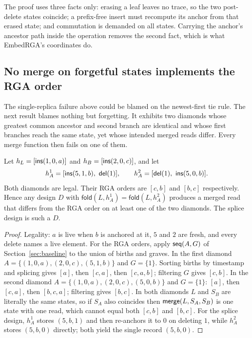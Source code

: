 The proof uses three facts only: erasing a leaf leaves no trace, so the two
post-delete states coincide; a prefix-free insert must recompute its anchor
from that erased state; and commutation is demanded on all states. Carrying
the anchor's ancestor path inside the operation removes the second fact,
which is what EmbedRGA's coordinates do.

\subsection{No merge on forgetful states implements the RGA order}

The single-replica failure above could be blamed on the newest-first tie
rule. The next result blames nothing but forgetting. It exhibits two
diamonds whose greatest common ancestor and second branch are identical and
whose first branches reach the same state, yet whose intended merged reads
differ. Every merge function then fails on one of them.

\begin{theorem}
\label{thm:fooling-rga}
Let $h_L=[\ins(1,0,a)]$ and $h_B=[\ins(2,0,c)]$, and let
\[
 h^1_A=[\ins(5,1,b),\ \del(1)],\qquad
 h^2_A=[\del(1),\ \ins(5,0,b)].
\]
Both diamonds are legal. Their RGA orders are $[c,b]$ and $[b,c]$
respectively. Hence any design $D$ with
$\mathsf{fold}(L,h^1_A)=\mathsf{fold}(L,h^2_A)$ produces a merged read that
differs from the RGA order on at least one of the two diamonds. The splice
design is such a $D$.
\end{theorem}

\begin{proof}
Legality: $a$ is live when $b$ is anchored at it, $5$ and $2$ are fresh, and
every delete names a live element. For the RGA orders, apply
$\seq(A,G)$ of Section~\ref{sec:baseline} to the union of births and graves.
In the first diamond $A=\{(1,0,a),(2,0,c),(5,1,b)\}$ and $G=\{1\}$. Sorting
births by timestamp and splicing gives $[a]$, then $[c,a]$, then $[c,a,b]$;
filtering $G$ gives $[c,b]$. In the second diamond
$A=\{(1,0,a),(2,0,c),(5,0,b)\}$ and $G=\{1\}$: $[a]$, then $[c,a]$, then
$[b,c,a]$; filtering gives $[b,c]$. In both diamonds $L$ and $S_B$ are
literally the same states, so if $S_A$ also coincides then
$\merge(L,S_A,S_B)$ is one state with one read, which cannot equal both
$[c,b]$ and $[b,c]$. For the splice design, $h^1_A$ stores $(5,b,1)$ and
then re-anchors it to $0$ on deleting $1$, while $h^2_A$ stores $(5,b,0)$
directly; both yield the single record $(5,b,0)$.
\end{proof}

